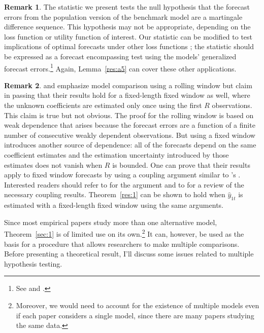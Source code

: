 \documentclass[11pt,fleqn]{article}
\newcommand\citepos[2][]{\citeauthor{#2}'s \citeyearpar[#1]{#2}}
\theoremstyle{definition}
\newtheorem{rem}{Remark}
\begin{document}
\begin{rem}
  The statistic we present tests the null hypothesis that the forecast
  errors from the population version of the benchmark model are a
  martingale difference sequence.  This hypothesis may not be
  appropriate, depending on the loss function or utility function of
  interest.  Our statistic can be modified to test implications of
  optimal forecasts under other loss functions
  \citep[see][]{PaT:07,PaT:07b}; the statistic should be expressed as
  a forecast encompassing test using the models' generalized forecast
  errors.\footnote{See \citet{HLN:98} and \citet[Section~4]{ClW:07}.}
  Again, Lemma~\ref{res:a5} can cover these other applications.
\end{rem}

\begin{rem}
  \citet{GiW:06} and \citet{ClW:06,ClW:07} emphasize model comparison
  using a rolling window but claim in passing that their results hold
  for a fixed-length fixed window as well, where the unknown
  coefficients are estimated only once using the first $R$
  observations.  This claim is true but not obvious.  The proof for
  the rolling window is based on weak dependence that arises because
  the forecast errors are a function of a finite number of consecutive
  weakly dependent observations.  But using a fixed window introduces
  another source of dependence: all of the forecasts depend on the
  same coefficient estimates and the estimation uncertainty introduced
  by those estimates does not vanish when $R$ is bounded.  One can
  prove that their results apply to fixed window forecasts by using a
  coupling argument similar to \citepos{Cal:11}.  Interested readers
  should refer to \citet{Cal:11} for the argument and to
  \citet{MeP:02} for a review of the necessary coupling results.
  Theorem~\ref{res:1} can be shown to hold when $\hat y_{1t}$ is
  estimated with a fixed-length fixed window using the same arguments.
\end{rem}

Since most empirical papers study more than one alternative model,
Theorem~\ref{sec:1} is of limited use on its own.\footnote{Moreover,
  we would need to account for the existence of multiple models even if
each paper considers a single model, since there are many papers
studying the same data.}  It can, however, be
used as the basis for a procedure that allows researchers to make
multiple comparisons.  Before presenting a theoretical result, I'll
discuss some issues related to multiple hypothesis testing.
\end{document}
